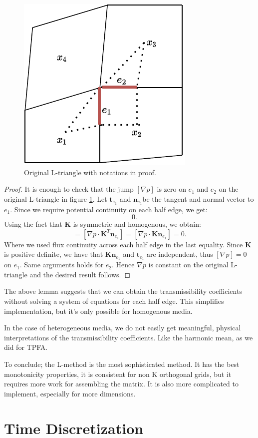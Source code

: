 \documentclass[../Main/main.tex]{subfiles}
\begin{document}
	\begin{figure}[H]
		\centering
		\includegraphics{right choice 2.pdf}	
		\caption{Original L-triangle with notations in proof.}
		\label{fig:original right choice}
	\end{figure}
	\begin{proof}
		It is enough to check that the jump $[\nabla p]$ is zero on $e_1$ and $e_2$ on the original L-triangle in figure \ref{fig:original right choice}. Let $\bm{t}_{e_1}$ and $\bm{n}_{e_1} $be the tangent and normal vector to $e_1$. Since we require potential continuity on each half edge, we get:
		\begin{equation}
			[\nabla p \cdot \bm{t}_{e_1}]=0.
		\end{equation}
		Using the fact that $\bm{K}$ is symmetric and homogenous, we obtain:
		\begin{equation}
			[\bm{K} \nabla p \cdot \bm{n}_{e_1}]=[\nabla p \cdot \bm{K}^T \bm{n}_{e_1}]=[\nabla p \cdot \bm{K}\bm{n}_{e_1}]=0.
		\end{equation}
		Where we used flux continuity across each half edge in the last equality. Since $\bm{K}$ is positive definite, we have that $\bm{K}\bm{n}_{e_1}$ and $\bm{t}_{e_1}$ are independent, thus $[\nabla p]=0$ on $e_1$. Same arguments holds for $e_2$. Hence $\nabla p$ is constant on the original L-triangle and the desired result follows.
	\end{proof}
	\begin{remark}
		The above lemma suggests that we can obtain the transmissibility coefficients without solving a system of equations for each half edge. This simplifies implementation, but it's only possible for homogenous media.
	\end{remark}
	\begin{remark}
		In the case of heterogeneous media, we do not easily get meaningful, physical interpretations of the transmissibility coefficients. Like the harmonic mean, as we did for TPFA. 
	\end{remark}
	\par 
	To conclude; the L-method is the most sophisticated method. It has the best monotonicity properties, it is consistent for non K orthogonal grids, but it requires more work for assembling the matrix. It is also more complicated to implement, especially for more dimensions.
	\section*{Time Discretization}	
	
	
\end{document}
